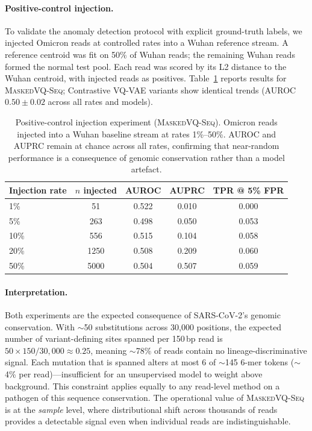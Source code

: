 \documentclass[pmlr]{jmlr}%
\newcommand{\ours}{\textsc{MaskedVQ-Seq}}
\begin{document}
\paragraph{Positive-control injection.}
To validate the anomaly detection protocol with explicit ground-truth labels, we injected Omicron reads at controlled rates into a Wuhan reference stream. A reference centroid was fit on 50\% of Wuhan reads; the remaining Wuhan reads formed the normal test pool. Each read was scored by its L2 distance to the Wuhan centroid, with injected reads as positives. Table~\ref{tab:injection} reports results for \ours{}; Contrastive VQ-VAE variants show identical trends (AUROC $0.50 \pm 0.02$ across all rates and models).

\begin{table}[!ht]
  \centering
  \caption{Positive-control injection experiment (\ours{}). Omicron reads injected into a Wuhan baseline stream at rates 1\%--50\%. AUROC and AUPRC remain at chance across all rates, confirming that near-random performance is a consequence of genomic conservation rather than a model artefact.}
  \label{tab:injection}
  \small
  \begin{tabular}{lcccc}
  \toprule
  \textbf{Injection rate} & \textbf{$n$ injected} & \textbf{AUROC} & \textbf{AUPRC} & \textbf{TPR @ 5\% FPR} \\
  \midrule
  1\%  &   51  & 0.522 & 0.010 & 0.000 \\
  5\%  &  263  & 0.498 & 0.050 & 0.053 \\
  10\% &  556  & 0.515 & 0.104 & 0.058 \\
  20\% & 1250  & 0.508 & 0.209 & 0.060 \\
  50\% & 5000  & 0.504 & 0.507 & 0.059 \\
  \bottomrule
  \end{tabular}
\end{table}

\paragraph{Interpretation.}
Both experiments are the expected consequence of SARS-CoV-2's genomic conservation. With $\sim$50 substitutions across 30,000 positions, the expected number of variant-defining sites spanned per 150\,bp read is $50 \times 150 / 30{,}000 \approx 0.25$, meaning $\sim$78\% of reads contain no lineage-discriminative signal. Each mutation that is spanned alters at most 6 of $\sim$145 6-mer tokens ($\sim$4\% per read)---insufficient for an unsupervised model to weight above background. This constraint applies equally to any read-level method on a pathogen of this sequence conservation. The operational value of \ours{} is at the \emph{sample} level, where distributional shift across thousands of reads provides a detectable signal even when individual reads are indistinguishable.
\end{document}
